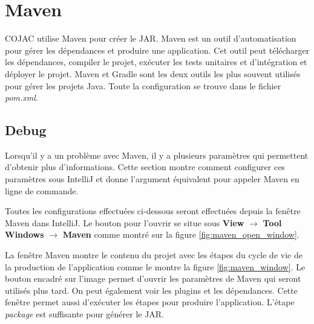 \section{Maven}

COJAC \cite{COJAC} utilise Maven \cite{maven} pour créer le JAR. Maven \cite{maven} est un outil d'automatisation pour gérer les dépendances et produire une application. Cet outil peut télécharger les dépendances, compiler le projet, exécuter les tests unitaires et d'intégration et déployer le projet. Maven et Gradle sont les deux outils les plus souvent utilisés pour gérer les projets Java. Toute la configuration se trouve dans le fichier \textit{pom.xml}.

\subsection{Debug}

Lorsqu'il y a un problème avec Maven, il y a plusieurs paramètres qui permettent d'obtenir plus d'informations. Cette section montre comment configurer ces paramètres sous IntelliJ et donne l'argument équivalent pour appeler Maven en ligne de commande.

\begin{minipage2}
\subtitle{Ouvrir la fenêtre Maven}

Toutes les configurations effectuées ci-dessous seront effectuées depuis la fenêtre Maven dans IntelliJ. Le bouton pour l'ouvrir se situe sous \textbf{View} $\rightarrow$ \textbf{Tool Windows} $\rightarrow$ \textbf{Maven} comme montré sur la figure \ref{fig:maven_open_window}.
\end{minipage2}

\begin{minipage}{\linewidth}%
\label{fig:maven_open_window}
\end{minipage}

\subtitle{}

\subtitle{Fenêtre Maven}

La fenêtre Maven montre le contenu du projet avec les étapes du cycle de vie de la production de l'application comme le montre la figure \ref{fig:maven_window}. Le bouton encadré sur l'image permet d'ouvrir les paramètres de Maven qui seront utilisés plus tard. On peut également voir les plugins et les dépendances. Cette fenêtre permet aussi d'exécuter les étapes pour produire l'application. L'étape \textit{package} est suffisante pour générer le JAR.

